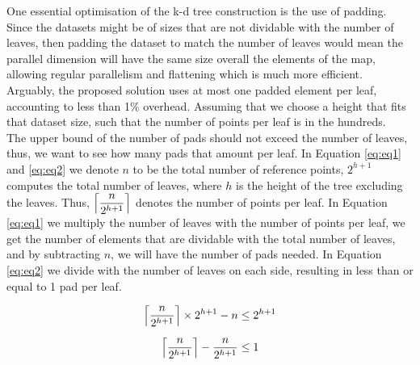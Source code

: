 One essential optimisation of the k-d tree construction is the use of padding. Since the datasets might be of sizes that are not dividable with the number of leaves, then padding the dataset to match the number of leaves would mean the parallel dimension will have the same size overall the elements of the map, allowing regular parallelism and flattening which is much more efficient.
\\[2mm]
Arguably, the proposed solution uses at most one padded element per leaf, accounting to less than 1\% overhead. Assuming that we choose a height that fits that dataset size, such that the number of points per leaf is in the hundreds. 
\\[2mm]
The upper bound of the number of pads should not exceed the number of leaves, thus, we want to see how many pads that amount per leaf. 
In Equation \ref{eq:eq1} and \ref{eq:eq2} we denote $n$ to be the total number of reference points, $2^{h+1}$ computes the total number of leaves, where $h$ is the height of the tree excluding the leaves. Thus, $\ceil*{\dfrac{n}{2^{h+1}}}$ denotes the number of points per leaf. In Equation \ref{eq:eq1} we multiply the number of leaves with the number of points per leaf, we get the number of elements that are dividable with the total number of leaves, and by subtracting $n$, we will have the number of pads needed. In Equation \ref{eq:eq2} we divide with the number of leaves on each side, resulting in less than or equal to 1 pad per leaf. 

\begin{align} \label{eq:eq1}
\ceil*{\dfrac{n}{2^{h+1}}} \times 2^{h+1} - n   &\leq 2^{h+1} \\[2mm]
\ceil*{\dfrac{n}{2^{h+1}}} - \dfrac{n}{2^{h+1}} &\leq 1 \label{eq:eq2}
\end{align}


